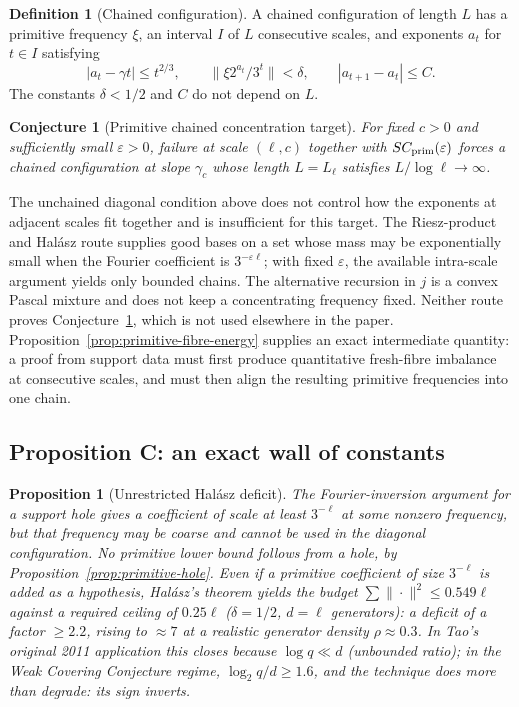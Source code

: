 \documentclass[11pt]{article}
\newtheorem{proposition}[theorem]{Proposition}
\newtheorem{conjecture}[theorem]{Conjecture}
\theoremstyle{definition}
\newtheorem{definition}[theorem]{Definition}
\theoremstyle{remark}
\begin{document}
\begin{definition}[Chained configuration]
A chained configuration of length $L$ has a primitive frequency $\xi$,
an interval $I$ of $L$ consecutive scales, and exponents $a_t$ for
$t\in I$ satisfying
\[
 |a_t-\gamma t|\le t^{2/3},\qquad
 \|\xi2^{a_t}/3^t\|<\delta,\qquad
 |a_{t+1}-a_t|\le C.
\]
The constants $\delta<1/2$ and $C$ do not depend on $L$.
\end{definition}

\begin{conjecture}[Primitive chained concentration target]
\label{lem:B}
For fixed $c>0$ and sufficiently small $\varepsilon>0$, failure at
scale $(\ell,c)$ together with $SC_{\rm prim}(\varepsilon)$ forces a
chained configuration at slope $\gamma_c$ whose length
$L=L_\ell$ satisfies $L/\log\ell\to\infty$.
\end{conjecture}

The unchained diagonal condition above does not control how the
exponents at adjacent scales fit together and is insufficient for this
target. The Riesz-product and Halász route supplies good bases on a set
whose mass may be exponentially small when the Fourier coefficient is
$3^{-\varepsilon\ell}$; with fixed $\varepsilon$, the available
intra-scale argument yields only bounded chains. The alternative
recursion in $j$ is a convex Pascal mixture and does not keep a
concentrating frequency fixed. Neither route proves
Conjecture~\ref{lem:B}, which is not used elsewhere in the paper.
Proposition~\ref{prop:primitive-fibre-energy} supplies an exact
intermediate quantity: a proof from support data must first produce
quantitative fresh-fibre imbalance at consecutive scales, and must then
align the resulting primitive frequencies into one chain.

\subsection{Proposition C: an exact wall of constants}

\begin{proposition}[Unrestricted Halász deficit]\label{prop:halasz-deficit}
The Fourier-inversion argument for a support hole gives a coefficient
of scale at least $3^{-\ell}$ at some nonzero frequency, but that
frequency may be coarse and cannot be used in the diagonal
configuration. No primitive lower bound follows from a hole, by
Proposition~\ref{prop:primitive-hole}. Even if a primitive coefficient
of size $3^{-\ell}$ is added as a hypothesis, Halász's theorem
\cite{Halasz1977} yields the budget $\sum\|\cdot\|^2\le 0.549\ell$
against a required ceiling of $0.25\ell$ ($\delta=1/2$, $d=\ell$
generators): a deficit of a factor $\ge 2.2$, rising to $\approx 7$ at
a realistic generator density $\rho\approx 0.3$. In Tao's original 2011
application this closes because $\log q\ll d$ (unbounded ratio); in
the Weak Covering Conjecture regime, $\log_2 q/d\ge 1.6$, and the
technique does more than degrade: its sign inverts.
\end{proposition}
\end{document}
